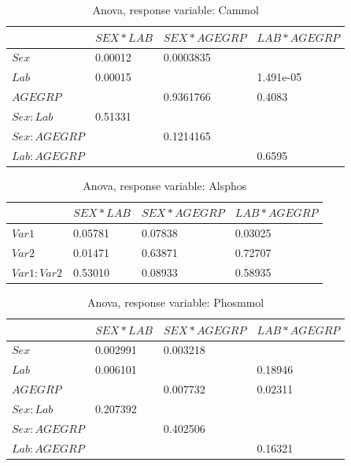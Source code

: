 \documentclass{article}
\begin{document}
    \begin{table}
    \begin{center}
    \begin{tabular}{|l|l|l|l|}
      \hline
      &$SEX * LAB$&$SEX * AGEGRP$&$LAB*AGEGRP$\\
      \hline
      $Sex$       &0.00012&0.0003835&\\
      $Lab$       &0.00015&         &1.491e-05\\
      $AGEGRP$    &       &0.9361766&0.4083\\
      $Sex:Lab$   &0.51331&         &\\
      $Sex:AGEGRP$&       &0.1214165&\\
      $Lab:AGEGRP$&       &         &0.6595\\
      \hline
    \end{tabular}
    \caption{Anova, response variable: Cammol}
    \label{table:AnCammol}
    \end{center}
    \end{table}

    \begin{table}
    \begin{center}
    \begin{tabular}{|l|l|l|l|}
      \hline
      &$SEX * LAB$&$SEX * AGEGRP$&$LAB*AGEGRP$\\
      \hline
      $Var1$       & 0.05781 & 0.07838 & 0.03025\\
      $Var2$       & 0.01471 & 0.63871 & 0.72707\\
      $Var1:Var2$  & 0.53010 & 0.08933 & 0.58935\\
      \hline
    \end{tabular}
    \caption{Anova, response variable: Alsphos}
    \label{table:AnAlsphos}
    \end{center}
    \end{table}

    \begin{table}
    \begin{center}
    \begin{tabular}{|l|l|l|l|}
      \hline
      &$SEX * LAB$&$SEX * AGEGRP$&$LAB*AGEGRP$\\
      \hline
      $Sex$       &0.002991&0.003218  &\\
      $Lab$       &0.006101&         &0.18946\\
      $AGEGRP$    &       &0.007732  &0.02311\\
      $Sex:Lab$   &0.207392&         &\\
      $Sex:AGEGRP$&       &0.402506  &\\
      $Lab:AGEGRP$&       &         &0.16321\\
      \hline
    \end{tabular}
    \caption{Anova, response variable: Phosmmol}
    \label{table:AnPhosmmol}
    \end{center}
    \end{table}
    
\end{document}
